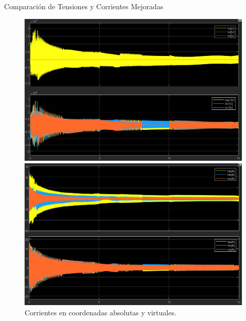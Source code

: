 \documentclass[12pt]{beamer}
\begin{document}
\begin{frame}{Comparación de Tensiones y Corrientes Mejoradas}
    \begin{figure}
        \centering
        \begin{minipage}{0.48\textwidth}
            \includegraphics[width=\textwidth]{Imagenes/Consignas_Tensiones_ModuladorTNImejorado.png}
            \caption{Tensiones en coordenadas absolutas y virtuales.}
        \end{minipage}
        \hfill
        \begin{minipage}{0.48\textwidth}
            \includegraphics[width=\textwidth]{Imagenes/Corrientes_ModuladorTNImejorado.png}
            \caption{Corrientes en coordenadas absolutas y virtuales.}
        \end{minipage}
    \end{figure}
\end{frame}
\end{document}
